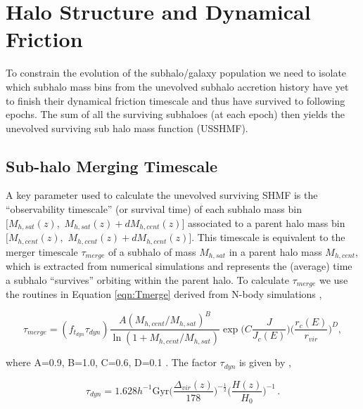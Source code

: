 \section{Halo Structure and Dynamical Friction}

To constrain the evolution of the subhalo/galaxy population we need to isolate which subhalo mass bins from the unevolved subhalo accretion history have yet to finish their dynamical friction timescale and thus have survived to following epochs. The sum of all the surviving subhaloes (at each epoch) then yields the unevolved surviving sub halo mass function (USSHMF). 

\subsection{Sub-halo Merging Timescale}
\label{sec:Timescale}
 A key parameter used to calculate the unevolved surviving SHMF is the ``observability timescale'' (or survival time) of each  subhalo mass bin $[M_{h,sat}(z),$ $M_{h,sat}(z) + dM_{h,cent}(z)]$ associated to a parent halo mass bin $[M_{h,cent}(z),$ $M_{h,cent}(z) + dM_{h,cent}(z)]$. This timescale is equivalent to the merger timescale $\tau_{merge}$ of a subhalo of mass $M_{h,sat}$ in a parent halo mass $M_{h,cent}$, which is extracted from numerical simulations and represents the (average) time a subhalo ``survives'' orbiting within the parent halo. To calculate $\tau_{merge}$ we use the routines in Equation \ref{eqn:Tmerge} derived from N-body simulations \citep{Boylan-Kolchin2008},

\begin{equation}
\label{eqn:Tmerge}
\tau_{merge} =
(f_{t_{dyn}}\tau_{dyn}) \frac{A(M_{h, cent}/M_{h,sat})^B}{\ln(1+M_{h, cent}/M_{h, sat})} \exp \Big(C\frac{J}{J_c(E)}\Big) \Big( \frac{r_c(E)}{r_{vir}} \Big)^D,
\end{equation}

where A=0.9, B=1.0, C=0.6, D=0.1 \citep{McCavana2012TheMergers}. The factor $\tau_{dyn}$ is given by \citep{Jiang2016StatisticsFunctions},

\begin{equation}
\label{eqn:tdyn}
\tau_{dyn} = 1.628 h^{-1} \mathrm{Gyr} \Big(\frac{\Delta_{vir}(z)}{178}\Big)^{-\frac{1}{2}} \Big(\frac{H(z)}{H_0}\Big)^{-1} \, .
\end{equation}

